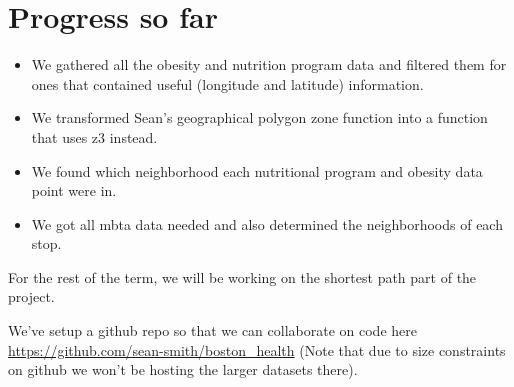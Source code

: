 \documentclass[12pt]{article}
\begin{document}
\section{Progress so far}
\begin{itemize}
\item We gathered all the obesity and nutrition program data and filtered them for ones that contained useful (longitude and latitude) information.
\item We transformed Sean's geographical polygon zone function into a function that uses z3 instead.
\item We found which neighborhood each nutritional program and obesity data point were in.
\item We got all mbta data needed and also determined the neighborhoods of each stop.
\end{itemize}

For the rest of the term, we will be working on the shortest path part of the project. 

We've setup a github repo so that we can collaborate on code here \url{https://github.com/sean-smith/boston_health} (Note that due to size constraints on github we won't be hosting the larger datasets there).
\end{document}

